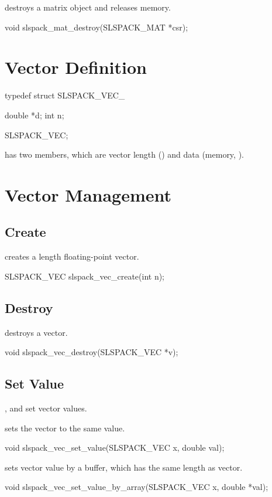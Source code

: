  destroys a matrix object and releases memory.
\begin{evb}
void slspack_mat_destroy(SLSPACK_MAT *csr);
\end{evb}

\section{Vector Definition}

\begin{evb}
typedef struct SLSPACK_VEC_
{
    double *d;
    int n;

} SLSPACK_VEC;
\end{evb}

 has two members, which are vector length () and data (memory,
).

\section{Vector Management}

\subsection{Create}
 creates a length  floating-point vector.
\begin{evb}
SLSPACK_VEC slspack_vec_create(int n);
\end{evb}

\subsection{Destroy}

 destroys a vector.
\begin{evb}
void slspack_vec_destroy(SLSPACK_VEC *v);
\end{evb}

\subsection{Set Value}
,  and 
set vector values.

 sets the vector to the same value.
\begin{evb}
void slspack_vec_set_value(SLSPACK_VEC x, double val);
\end{evb}


 sets vector value by a buffer, which has the same length as
vector.
\begin{evb}
void slspack_vec_set_value_by_array(SLSPACK_VEC x, double *val);
\end{evb}

